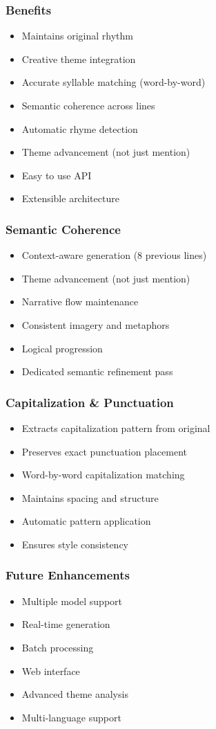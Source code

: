 \documentclass[aspectratio=169]{beamer}
\begin{document}
\begin{frame}
\frametitle{Benefits}
\begin{itemize}
    \item Maintains original rhythm
    \item Creative theme integration
    \item Accurate syllable matching (word-by-word)
    \item Semantic coherence across lines
    \item Automatic rhyme detection
    \item Theme advancement (not just mention)
    \item Easy to use API
    \item Extensible architecture
\end{itemize}
\end{frame}

\begin{frame}
\frametitle{Semantic Coherence}
\begin{itemize}
    \item Context-aware generation (8 previous lines)
    \item Theme advancement (not just mention)
    \item Narrative flow maintenance
    \item Consistent imagery and metaphors
    \item Logical progression
    \item Dedicated semantic refinement pass
\end{itemize}
\end{frame}

\begin{frame}
\frametitle{Capitalization \& Punctuation}
\begin{itemize}
    \item Extracts capitalization pattern from original
    \item Preserves exact punctuation placement
    \item Word-by-word capitalization matching
    \item Maintains spacing and structure
    \item Automatic pattern application
    \item Ensures style consistency
\end{itemize}
\end{frame}

\begin{frame}
\frametitle{Future Enhancements}
\begin{itemize}
    \item Multiple model support
    \item Real-time generation
    \item Batch processing
    \item Web interface
    \item Advanced theme analysis
    \item Multi-language support
\end{itemize}
\end{frame}
\end{document}
